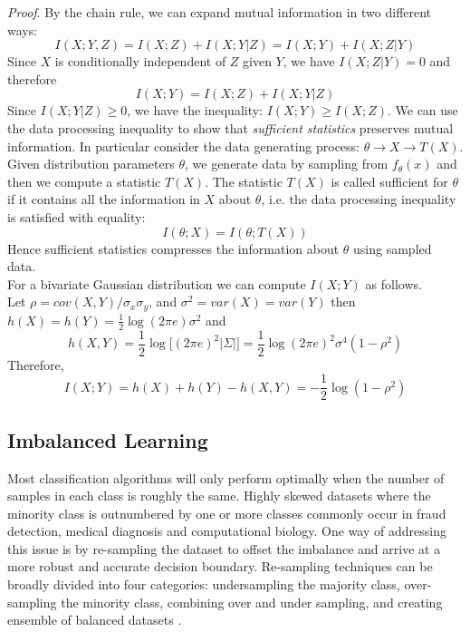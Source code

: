 \textit{Proof}. By the chain rule, we can expand mutual information in two different ways:
\begin{equation}
    I(X;Y,Z) = I(X;Z) + I(X;Y|Z) = I(X;Y) + I(X;Z|Y)
\end{equation}
Since $X$ is conditionally independent of $Z$ given $Y$, we have $I(X;Z|Y) = 0$ and therefore
\begin{equation}
    I(X;Y) = I(X;Z) + I(X;Y|Z)
\end{equation}
Since $I(X;Y|Z) \geq 0$, we have the inequality: $I(X;Y)\geq I(X;Z)$.
We can use the data processing inequality to show that \textit{sufficient statistics} preserves mutual information. In particular consider the data generating process: $\theta \rightarrow X \rightarrow T(X)$. Given distribution parameters $\theta$, we generate data by sampling from $f_{\theta}(x)$ and then we compute a statistic $T(X)$. The statistic $T(X)$ is called sufficient for $\theta$ if it contains all the information in $X$ about $\theta$, i.e. the data processing inequality is satisfied with equality:
\begin{equation}
    I(\theta; X) = I(\theta; T(X))
\end{equation}
Hence sufficient statistics compresses the information about $\theta$ using sampled data.\\

For a bivariate Gaussian distribution we can compute $I(X;Y)$ as follows.\\
Let $\rho = cov(X,Y)/\sigma_x \sigma_y$, and $\sigma^2 = var(X) = var(Y)$ then $h(X) = h(Y) = \frac{1}{2}\log(2\pi e)\sigma^2$ and
\begin{equation}
    h(X,Y) = \frac{1}{2}\log\big[(2\pi e)^{2}|\Sigma|\big] = \frac{1}{2}\log(2\pi e)^{2}\sigma^4(1-\rho^2)
\end{equation}
Therefore,
\begin{equation}
    I(X;Y) = h(X) + h(Y) - h(X,Y) = -\frac{1}{2}\log (1- \rho^2)
\end{equation}


\subsection{Imbalanced Learning}

Most classification algorithms will only perform optimally when the number of samples in each class is roughly the same. Highly skewed datasets where the minority class is outnumbered by one or more classes commonly occur in fraud detection, medical diagnosis and computational biology. One way of addressing this issue is by re-sampling the dataset to offset the imbalance and arrive at a more robust and accurate decision boundary. Re-sampling techniques can be broadly divided into four categories: undersampling the majority class, over-sampling the minority class, combining over and under sampling, and creating ensemble of balanced datasets \cite{He2009}.\\

